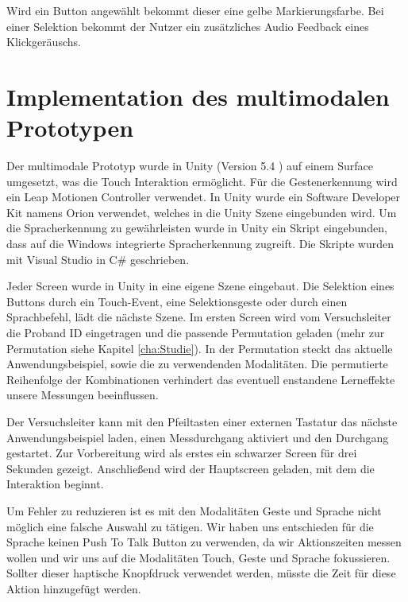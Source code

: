 Wird ein Button angewählt bekommt dieser eine gelbe Markierungsfarbe. 
Bei einer Selektion bekommt der Nutzer ein zusätzliches Audio Feedback eines Klickgeräuschs.

\section[Implementation]{Implementation des multimodalen Prototypen}
Der multimodale Prototyp wurde in Unity (Version 5.4 \citep{Unity}) auf einem Surface umgesetzt, was die Touch Interaktion ermöglicht. 
Für die Gestenerkennung wird ein Leap Motionen Controller \citep{Leap} verwendet. 
In Unity wurde ein Software Developer Kit namens Orion \citep{OrionBeta} verwendet, welches in die Unity Szene eingebunden wird. 
Um die Spracherkennung zu gewährleisten wurde in Unity ein Skript eingebunden, dass auf die Windows integrierte Spracherkennung zugreift. 
Die Skripte wurden mit Visual Studio in C\# geschrieben.

Jeder Screen wurde in Unity in eine eigene Szene eingebaut.
Die Selektion eines Buttons durch ein Touch-Event, eine Selektionsgeste oder durch einen Sprachbefehl, lädt die nächste Szene. 
Im ersten Screen wird vom Versuchsleiter die Proband ID eingetragen und die passende Permutation geladen (mehr zur Permutation siehe Kapitel \ref{cha:Studie}). 
In der Permutation steckt das aktuelle Anwendungsbeispiel, sowie die zu verwendenden Modalitäten. 
Die permutierte Reihenfolge der Kombinationen verhindert das eventuell enstandene Lerneffekte unsere Messungen beeinflussen. 

Der Versuchsleiter kann mit den Pfeiltasten einer externen Tastatur das nächste Anwendungsbeispiel laden, einen Messdurchgang aktiviert und den Durchgang gestartet.  
Zur Vorbereitung wird als erstes ein schwarzer Screen für drei Sekunden gezeigt.
Anschließend wird der Hauptscreen geladen, mit dem die Interaktion beginnt.

Um Fehler zu reduzieren ist es mit den Modalitäten Geste und Sprache nicht möglich eine falsche Auswahl zu tätigen. 
Wir haben uns entschieden für die Sprache keinen Push To Talk Button zu verwenden, da wir Aktionszeiten messen wollen und wir uns auf die Modalitäten Touch, Geste und Sprache fokussieren. 
Sollter dieser haptische Knopfdruck verwendet werden, müsste die Zeit für diese Aktion hinzugefügt werden.  

